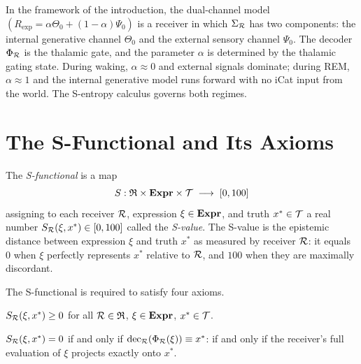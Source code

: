 \begin{remark}\label{rem:receiver-dual}
In the framework of the introduction, the dual-channel model $(R_{\mathrm{exp}} = \alpha \Theta_0 + (1-\alpha)\Psi_0)$ is a receiver in which $\Sigma_{\mathcal{R}}$ has two components: the internal generative channel $\Theta_0$ and the external sensory channel $\Psi_0$. The decoder $\Phi_{\mathcal{R}}$ is the thalamic gate, and the parameter $\alpha$ is determined by the thalamic gating state. During waking, $\alpha \approx 0$ and external signals dominate; during REM, $\alpha \approx 1$ and the internal generative model runs forward with no iCat input from the world. The S-entropy calculus governs both regimes.
\end{remark}


\section{The S-Functional and Its Axioms}
\label{sec:s-functional}

\begin{definition}[S-functional]\label{def:s-functional}
The \emph{S-functional} is a map
\[
S : \mathfrak{R} \times \mathbf{Expr} \times \mathcal{T} \;\longrightarrow\; [0, 100]
\]
assigning to each receiver $\mathcal{R}$, expression $\xi \in \mathbf{Expr}$, and truth $x^* \in \mathcal{T}$ a real number $S_{\mathcal{R}}(\xi, x^*) \in [0, 100]$ called the \emph{S-value}. The S-value is the epistemic distance between expression $\xi$ and truth $x^*$ as measured by receiver $\mathcal{R}$: it equals $0$ when $\xi$ perfectly represents $x^*$ relative to $\mathcal{R}$, and $100$ when they are maximally discordant.
\end{definition}

The S-functional is required to satisfy four axioms.

\begin{axiom}\label{ax:S1}
$S_{\mathcal{R}}(\xi, x^*) \geq 0$ for all $\mathcal{R} \in \mathfrak{R}$, $\xi \in \mathbf{Expr}$, $x^* \in \mathcal{T}$.
\end{axiom}

\begin{axiom}\label{ax:S2}
$S_{\mathcal{R}}(\xi, x^*) = 0$ if and only if $\mathrm{dec}_{\mathcal{R}}(\Phi_{\mathcal{R}}(\xi)) \equiv x^*$: if and only if the receiver's full evaluation of $\xi$ projects exactly onto $x^*$.
\end{axiom}

